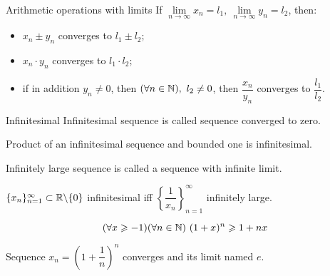 \begin{theorema}{Arithmetic operations with limits}{}
    If $\lim\limits_{n\to \infty} x_n = l_1, \ \lim\limits_{n\to\infty} y_n = l_2$, then:
    \begin{itemize}
        \item $x_n \pm y_n$ converges to $l_1 \pm l_2$;
        \item $x_n\cdot y_n$ converges to $l_1\cdot l_2$;
        \item if in addition $y_n \neq 0$, then $(\forall n \in \mathbb{N}), \ l_2 \neq 0$, then $\dfrac{x_n}{y_n}$ converges to $\dfrac{l_1}{l_2}$.
    \end{itemize}
\end{theorema}
\begin{definition}{Infinitesimal}{}
    Infinitesimal sequence is called sequence converged to zero.
\end{definition}

\begin{theorema}{}{}
  Product of an infinitesimal sequence and bounded one is infinitesimal.  
\end{theorema}

\begin{definition}{}{}
    Infinitely large sequence is called a sequence with infinite limit.
\end{definition}

\begin{theorema}{}{}
  $\{x_n\}_{n=1}^\infty \subset \mathbb{R} \backslash \{0\}$ infinitesimal iff $\left\{\dfrac{1}{x_n}\right\}_{n=1}^\infty$ infinitely large.
\end{theorema}

\begin{lemma}{}{}
    \useshortskip
    \[
        (\forall x \geq -1) (\forall n \in \N) \ (1 + x)^n \geq 1+nx
    \]  
\end{lemma}

\begin{theorema}{}{}
    Sequence $x_n = \left(1 + \dfrac{1}{n}\right)^n$ converges and its limit named $e$.
\end{theorema}